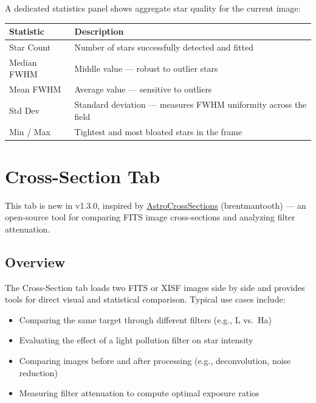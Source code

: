 \documentclass[11pt,a4paper]{article}
\begin{document}
A dedicated statistics panel shows aggregate star quality for the current image:

\begin{center}
\begin{tabular}{lp{8cm}}
\toprule
\textbf{Statistic} & \textbf{Description} \\
\midrule
Star Count & Number of stars successfully detected and fitted \\
Median FWHM & Middle value --- robust to outlier stars \\
Mean FWHM & Average value --- sensitive to outliers \\
Std Dev & Standard deviation --- measures FWHM uniformity across the field \\
Min / Max & Tightest and most bloated stars in the frame \\
\bottomrule
\end{tabular}
\end{center}


\section{Cross-Section Tab}
\label{sec:crosssection}

\begin{newfeaturebox}[New in v1.3.0]
This tab is new in v1.3.0, inspired by \href{https://github.com/brentmantooth/AstroCrossSections}{AstroCrossSections} (brentmantooth) --- an open-source tool for comparing FITS image cross-sections and analyzing filter attenuation.
\end{newfeaturebox}

\subsection{Overview}

The Cross-Section tab loads two FITS or XISF images side by side and provides tools for direct visual and statistical comparison. Typical use cases include:

\begin{itemize}
    \item Comparing the same target through different filters (e.g., L vs.\ Ha)
    \item Evaluating the effect of a light pollution filter on star intensity
    \item Comparing images before and after processing (e.g., deconvolution, noise reduction)
    \item Measuring filter attenuation to compute optimal exposure ratios
\end{itemize}
\end{document}
